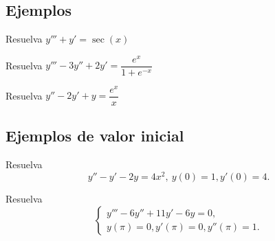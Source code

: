 \subsection{Ejemplos}


\begin{problema}
	\label{bron:exmp:12.1}
	Resuelva $y'''+y'=\sec(x)$
\end{problema}




\begin{problema}
	\label{bron:12.2}
	Resuelva $y'''-3y''+2y'=\dfrac{e^{x}}{1+e^{-x}}$
\end{problema}




\begin{problema}
	\label{bron:12.3}
	Resuelva $y''-2y'+y=\dfrac{e^x}{x}$
\end{problema}



\subsection{Ejemplos de valor inicial}


\label{bron:13.1}
\begin{problema}
	Resuelva
	$$
	y''-y'-2y=4x^{2}, \ y(0)=1, y'(0)=4.
	$$
\end{problema}




\begin{problema}
	\label{bron:13.4}
	Resuelva
	$$\begin{cases}
		y'''-6y''+11y'-6y=0, \\
		y(\pi)=0, y'(\pi)=0, y''(\pi)=1.
	\end{cases}
	$$
\end{problema}




